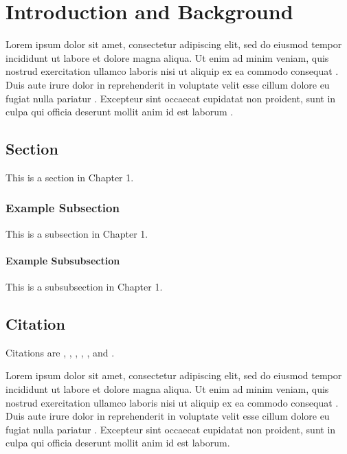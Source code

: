 \chapter{Introduction and Background}
\label{chap:introduction}

Lorem ipsum dolor sit amet, consectetur adipiscing elit, sed do eiusmod tempor incididunt ut labore et dolore magna aliqua. Ut enim ad minim veniam, quis nostrud exercitation ullamco laboris nisi ut aliquip ex ea commodo consequat \textcite{ref1}. Duis aute irure dolor in reprehenderit in voluptate velit esse cillum dolore eu fugiat nulla pariatur \textcite{ref2}. Excepteur sint occaecat cupidatat non proident, sunt in culpa qui officia deserunt mollit anim id est laborum \textcite{ref3}.

\section{Section}
\label{sec:sec-1-1}

This is a section in Chapter 1.

\subsection{Example Subsection}
\label{subsec:sec-1-1-1}

This is a subsection in Chapter 1.

\subsubsection{Example Subsubsection}

This is a subsubsection in Chapter 1.

\section{Citation}
\label{sec:citation}

Citations are \textcite{ref1}, \textcite{ref2}, \textcite{ref3}, \textcite{ref4}, 
\textcite{einstein}, \textcite{knuth-fa} and \textcite{dirac}.

Lorem ipsum dolor sit amet, consectetur adipiscing elit, sed do eiusmod tempor incididunt ut labore et dolore magna aliqua. Ut enim ad minim veniam, quis nostrud exercitation ullamco laboris nisi ut aliquip ex ea commodo consequat \textcite{ref1}. Duis aute irure dolor in reprehenderit in voluptate velit esse cillum dolore eu fugiat nulla pariatur \textcite{ref2}. Excepteur sint occaecat cupidatat non proident, sunt in culpa qui officia deserunt mollit anim id est laborum.
